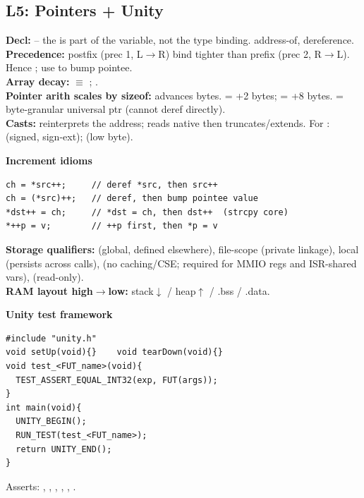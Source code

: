 \subsection{L5: Pointers + Unity}
\textbf{Decl:}  -- the \cee{*} is part of the variable, not the type binding.  address-of,  dereference.\\
\textbf{Precedence:} postfix \cee{[],++,--} (prec 1, L$\to$R) bind tighter than prefix  (prec 2, R$\to$L). Hence ; use  to bump pointee.\\
\textbf{Array decay:}  $\equiv$ ; .\\
\textbf{Pointer arith scales by sizeof:}  advances  bytes.  = +2 bytes;  = +8 bytes.  = byte-granular universal ptr (cannot deref directly).\\
\textbf{Casts:}  reinterprets the address;  reads native then truncates/extends. For :  (signed, sign-ext);  (low byte).

\textbf{Increment idioms}
\begin{lstlisting}[language={}]
ch = *src++;     // deref *src, then src++
ch = (*src)++;   // deref, then bump pointee value
*dst++ = ch;     // *dst = ch, then dst++  (strcpy core)
*++p = v;        // ++p first, then *p = v
\end{lstlisting}

\textbf{Storage qualifiers:}  (global, defined elsewhere),  file-scope (private linkage),  local (persists across calls),  (no caching/CSE; required for MMIO regs and ISR-shared vars),  (read-only).\\
\textbf{RAM layout high$\to$low:} stack$\downarrow$ / heap$\uparrow$ / .bss / .data.

\textbf{Unity test framework}
\begin{lstlisting}[language={}]
#include "unity.h"
void setUp(void){}    void tearDown(void){}
void test_<FUT_name>(void){
  TEST_ASSERT_EQUAL_INT32(exp, FUT(args));
}
int main(void){
  UNITY_BEGIN();
  RUN_TEST(test_<FUT_name>);
  return UNITY_END();
}
\end{lstlisting}
Asserts: , , , , , .

